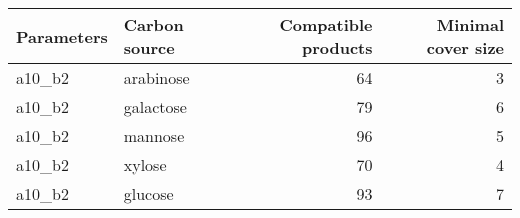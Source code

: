 \begin{tabular}{llrr}
\toprule
Parameters & Carbon source &  Compatible products &  Minimal cover size \\
\midrule
 a10\_b2 &  arabinose &  64 &  3 \\
 a10\_b2 &  galactose &  79 &  6 \\
 a10\_b2 &  mannose &  96 &  5 \\
 a10\_b2 &  xylose &  70 &  4 \\
 a10\_b2 &  glucose &  93 &  7 \\
\bottomrule
\end{tabular}

